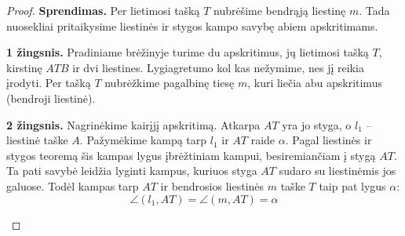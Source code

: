 \documentclass[11pt,a4paper]{scrartcl}
\begin{document}
\begin{proof}
\textbf{Sprendimas.} Per lietimosi tašką $T$ nubrėšime bendrąją liestinę $m$. Tada nuosekliai pritaikysime liestinės ir stygos kampo savybę abiem apskritimams.

\textbf{1 žingsnis.} Pradiniame brėžinyje turime du apskritimus, jų lietimosi tašką \(T\), kirstinę \(ATB\) ir dvi liestines. Lygiagretumo kol kas nežymime, nes jį reikia įrodyti. Per tašką \(T\) nubrėžkime pagalbinę tiesę \(m\), kuri liečia abu apskritimus (bendroji liestinė).
\begin{center}
\end{center}

\textbf{2 žingsnis.} Nagrinėkime kairįjį apskritimą. Atkarpa $AT$ yra jo styga, o $l_1$ – liestinė taške $A$. Pažymėkime kampą tarp $l_1$ ir $AT$ raide $\alpha$. Pagal liestinės ir stygos teoremą šis kampas lygus įbrėžtiniam kampui, besiremiančiam į stygą $AT$. Ta pati savybė leidžia lyginti kampus, kuriuos styga $AT$ sudaro su liestinėmis jos galuose. Todėl kampas tarp $AT$ ir bendrosios liestinės $m$ taške $T$ taip pat lygus $\alpha$:
\begin{equation*}
\angle (l_1, AT) = \angle (m, AT) = \alpha 
\end{equation*}
\begin{center}
\end{center}
\end{proof}
\end{document}
